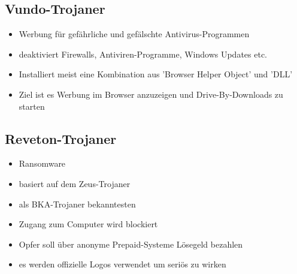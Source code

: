 \subsection{Vundo-Trojaner}
\begin{itemize}
    \item Werbung für gefährliche und gefälschte Antivirus-Programmen
    \item deaktiviert Firewalls, Antiviren-Programme, Windows Updates etc.
    \item Installiert meist eine Kombination aus 'Browser Helper Object' und 'DLL'
    \item Ziel ist es Werbung im Browser anzuzeigen und Drive-By-Downloads zu starten 
\end{itemize}
\subsection{Reveton-Trojaner}
\begin{itemize}
    \item Ransomware
    \item basiert auf dem Zeus-Trojaner
    \item als BKA-Trojaner bekanntesten
    \item Zugang zum Computer wird blockiert
    \item Opfer soll über anonyme Prepaid-Systeme Lösegeld bezahlen
    \item es werden offizielle Logos verwendet um seriös zu wirken
\end{itemize}
\cite{BEKTRO}